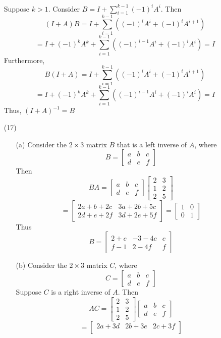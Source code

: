 \begin{itemize}
Suppose $k > 1$. Consider $B = I + \sum_{i=1}^{k-1}(-1)^iA^i$. Then
$$(I+A)B = I + \sum_{i=1}^{k-1}\left((-1)^iA^i + (-1)^iA^{i+1}\right)$$
$$= I + (-1)^kA^k + \sum_{i=1}^{k-1}
\left( (-1)^{i-1}A^i + (-1)^iA^i \right) = I$$
Furthermore,
$$B(I+A) = I + \sum_{i=1}^{k-1}\left((-1)^iA^i + (-1)^iA^{i+1}\right)$$
$$= I + (-1)^kA^k + \sum_{i=1}^{k-1}
\left( (-1)^{i-1}A^i + (-1)^iA^i \right) = I$$
Thus, $(I + A)^{-1} = B$
\item[(17)]
\begin{itemize}
\item[(a)]
Consider the $2 \times 3$ matrix $B$ that is a left inverse of $A$, where
$$B = \begin{bmatrix}
a & b & c \\
d & e & f
\end{bmatrix}$$
Then
$$BA = \begin{bmatrix}
a & b & c \\
d & e & f
\end{bmatrix}\begin{bmatrix}
2 & 3 \\
1 & 2 \\
2 & 5
\end{bmatrix}$$
$$= \begin{bmatrix}
2a + b + 2c & 3a + 2b + 5c \\
2d + e + 2f & 3d + 2e + 5f
\end{bmatrix} = \begin{bmatrix}
1 & 0 \\
0 & 1
\end{bmatrix}$$
Thus
$$B = \begin{bmatrix}
2 + c & -3 - 4c & c \\
f - 1 & 2 - 4f & f
\end{bmatrix}$$
\item[(b)]
Consider the $2 \times 3$ matrix $C$, where
$$C = \begin{bmatrix}
a & b & c \\
d & e & f
\end{bmatrix}$$
Suppose $C$ is a right inverse of $A$. Then
$$AC = \begin{bmatrix}
2 & 3 \\
1 & 2 \\
2 & 5
\end{bmatrix}\begin{bmatrix}
a & b & c \\
d & e & f
\end{bmatrix}$$
$$ = \begin{bmatrix}
2a + 3d & 2b + 3e & 2c + 3f \\

\end{bmatrix}$$
\end{itemize}
\end{itemize}
